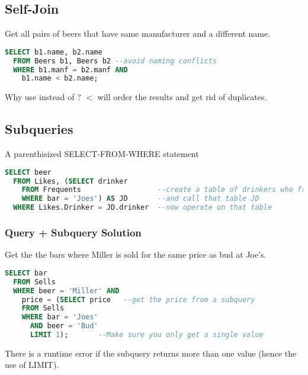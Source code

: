 \documentclass[12pt]{article}
\begin{document}
\subsection{Self-Join}
Get all pairs of beers that have same manufacturer and a different name.
\begin{lstlisting}[language=SQL]
  SELECT b1.name, b2.name
  FROM Beers b1, Beers b2 --avoid naming conflicts
  WHERE b1.manf = b2.manf AND
    b1.name < b2.name;
\end{lstlisting}
Why use \fbox{$<$} instead of \fbox{$<>$}? $<$ will order the results and get
rid of duplicates.

\subsection{Subqueries}
A parenthisized SELECT-FROM-WHERE statement

\begin{lstlisting}[language=SQL]
  SELECT beer
  FROM Likes, (SELECT drinker
    FROM Frequents                  --create a table of drinkers who frequent joes
    WHERE bar = 'Joes') AS JD       --and call that table JD
  WHERE Likes.Drinker = JD.drinker  --now operate on that table
\end{lstlisting}


\subsubsection{Query + Subquery Solution}
Get the the bars where Miller is sold for the same price as bud at Joe's.
\begin{lstlisting}[language=SQL]
  SELECT bar
  FROM Sells
  WHERE beer = 'Miller' AND
    price = (SELECT price   --get the price from a subquery
    FROM Sells
    WHERE bar = 'Joes'
      AND beer = 'Bud'
      LIMIT 1);       --Make sure you only get a single value
\end{lstlisting}
There is a runtime error if the subquery returns more than one value (hence the
use of LIMIT).
\end{document}

